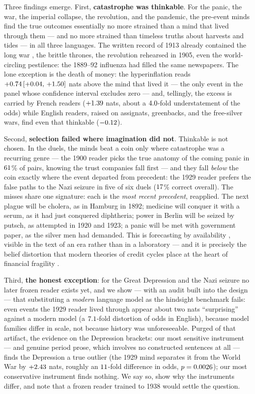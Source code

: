 \documentclass[11pt]{article}
\begin{document}
Three findings emerge. First, \textbf{catastrophe was thinkable}. For the panic, the war, the imperial
collapse, the revolution, and the pandemic, the pre-event minds find the true outcomes essentially no more
strained than a mind that lived through them --- and no more strained than timeless truths about harvests and
tides --- in all three languages. The written record of 1913 already contained the long war
\citep{bloch1899}, the brittle thrones, the revolution rehearsed in 1905, even the world-circling pestilence:
the 1889--92 influenza had filled the same newspapers. The lone exception is the death of money: the
hyperinflation reads $+0.74\,[+0.04,\,+1.50]$ nats above the mind that lived it --- the only event in the panel whose
confidence interval excludes zero --- and, tellingly, the excess is carried by French readers
($+1.39$ nats, about a $4.0$-fold understatement of the odds) while English readers, raised
on assignats, greenbacks, and the free-silver wars, find even that thinkable ($-0.12$).

Second, \textbf{selection failed where imagination did not}. Thinkable is not chosen. In the duels, the
minds beat a coin only where catastrophe was a recurring genre --- the 1900 reader picks the true anatomy of
the coming panic in $61$\% of pairs, knowing the trust companies fall first --- and they fall
\emph{below} the coin exactly where the event departed from precedent: the 1929 reader prefers the false
paths to the Nazi seizure in five of six duels ($17$\% correct overall). The misses share one
signature: each is the \emph{most recent precedent}, reapplied. The next plague will be cholera, as in
Hamburg in 1892; medicine will conquer it with a serum, as it had just conquered diphtheria; power in Berlin
will be seized by putsch, as attempted in 1920 and 1923; a panic will be met with government paper, as the
silver men had demanded. This is forecasting by availability \citep{tversky1973}, visible in the text of an
era rather than in a laboratory --- and it is precisely the belief distortion that modern theories of credit
cycles place at the heart of financial fragility \citep{bordalo2018,gennaioli2018}.

Third, \textbf{the honest exception}: for the Great Depression and the Nazi seizure no later frozen reader
exists yet, and we show --- with an audit built into the design --- that substituting a \emph{modern} language
model as the hindsight benchmark fails: even events the 1929 reader lived through appear about two nats
``surprising'' against a modern model (a $7.1$-fold distortion of odds in English), because model
families differ in scale, not because history was unforeseeable. Purged of that artifact, the evidence on the
Depression brackets: our most sensitive instrument --- and genuine period prose, which involves no constructed
sentences at all --- finds the Depression a true outlier (the 1929 mind separates it from the World War by
$+2.43$ nats, roughly an $11$-fold difference in odds, $p=0.0026$); our most
conservative instrument finds nothing. We say so, show why the instruments differ, and note that a frozen
reader trained to 1938 would settle the question.
\end{document}
